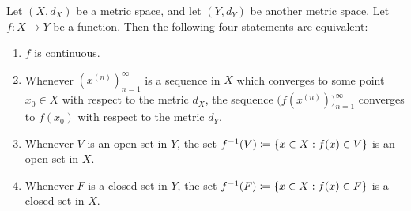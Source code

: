 \begin{thm}\label{ii:2.1.5}
  Let \((X, d_X)\) be a metric space, and let \((Y, d_Y)\) be another metric space.
  Let \(f : X \to Y\) be a function.
  Then the following four statements are equivalent:
  \begin{enumerate}
    \item\label{ii:2.1.5.a} \(f\) is continuous.
    \item\label{ii:2.1.5.b} Whenever \((x^{(n)})_{n = 1}^\infty\) is a sequence in \(X\) which converges to some point \(x_0 \in X\) with respect to the metric \(d_X\), the sequence \(\big(f(x^{(n)})\big)_{n = 1}^\infty\) converges to \(f(x_0)\) with respect to the metric \(d_Y\).
    \item\label{ii:2.1.5.c} Whenever \(V\) is an open set in \(Y\), the set \(f^{-1}(V) \coloneqq \left\lbrace x \in X : f(x) \in V\right\rbrace\) is an open set in \(X\).
    \item\label{ii:2.1.5.d} Whenever \(F\) is a closed set in \(Y\), the set \(f^{-1}(F) \coloneqq \left\lbrace x \in X : f(x) \in F\right\rbrace\) is a closed set in \(X\).
  \end{enumerate}
\end{thm}

